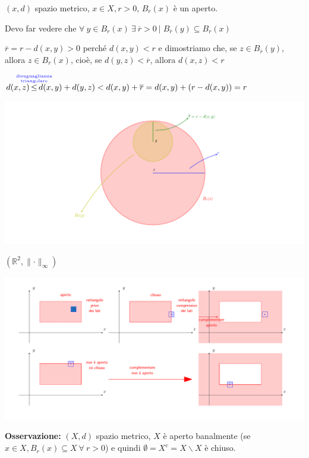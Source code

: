 \begin{exbar}
\begin{example}
	$(x,d)$ spazio metrico, $x \in X, r>0$, $B_r(x)$ è un aperto.
	
	Devo far vedere che $\forall \ y \in B_r(x) \ \exists \ \overline{r} > 0 \ \big| \; B_{\overline{r}}(y) \subseteq B_r(x)$
	
	$\overline{r} = r - d(x,y) > 0$ perché $d(x,y) < r$ e dimostriamo che, se $z \in B_{\overline{r}} (y)$, allora $z\in B_r(x)$, cioè, se $d(y,z)< \overline{r}$, allora $d(x,z)<r$
	
	$d(x,z) \distr  d(x,y) + d(y,z) < d(x,y) + \overline{r} = d(x,y) + (r-d(x,y)) = r$	
	\begin{center}
		\includegraphics[width=0.75\linewidth]{spazi_metrici_e_normati/pag141}
		\label{fig:pag141}
	\end{center}
\end{example}
\end{exbar}


\begin{exbar}
	$(\mathbb{R}^2, \parallel \cdot \parallel_\infty)$
	\begin{center}
		\includegraphics[width=\linewidth]{spazi_metrici_e_normati/pag141-142}
		\label{fig:pag141-142}
	\end{center}
\end{exbar}


\textbf{Osservazione:} 
	$(X,d)$ spazio metrico, $X$ è aperto banalmente (se $x \in X, B_r(x) \subseteq X \ \forall \ r > 0$) e quindi $\emptyset = X^c = X \backslash X$ è chiuso. 
	
